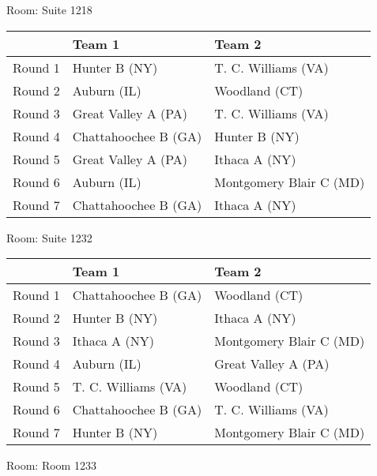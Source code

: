 \documentclass{article}%
\begin{document}
\vspace*{8pt}%
\linebreak%
\begin{flushleft}%
\begin{Large}%
Room: Suite 1218%
\end{Large}%
\end{flushleft}%
\begin{tabularx}{\textwidth}{|c|Y|Y|}%
\hline%
&Team 1&Team 2\\%
\hline%
Round 1&Hunter B (NY)&T. C. Williams (VA)\\%
Round 2&Auburn (IL)&Woodland (CT)\\%
Round 3&Great Valley A (PA)&T. C. Williams (VA)\\%
Round 4&Chattahoochee B (GA)&Hunter B (NY)\\%
Round 5&Great Valley A (PA)&Ithaca A (NY)\\%
Round 6&Auburn (IL)&Montgomery Blair C (MD)\\%
Round 7&Chattahoochee B (GA)&Ithaca A (NY)\\%
\hline%
\end{tabularx}%
\vspace*{8pt}%
\linebreak%
\begin{flushleft}%
\begin{Large}%
Room: Suite 1232%
\end{Large}%
\end{flushleft}%
\begin{tabularx}{\textwidth}{|c|Y|Y|}%
\hline%
&Team 1&Team 2\\%
\hline%
Round 1&Chattahoochee B (GA)&Woodland (CT)\\%
Round 2&Hunter B (NY)&Ithaca A (NY)\\%
Round 3&Ithaca A (NY)&Montgomery Blair C (MD)\\%
Round 4&Auburn (IL)&Great Valley A (PA)\\%
Round 5&T. C. Williams (VA)&Woodland (CT)\\%
Round 6&Chattahoochee B (GA)&T. C. Williams (VA)\\%
Round 7&Hunter B (NY)&Montgomery Blair C (MD)\\%
\hline%
\end{tabularx}%
\vspace*{8pt}%
\linebreak%
\begin{flushleft}%
\begin{Large}%
Room: Room 1233%
\end{Large}%
\end{flushleft}%
\end{document}
